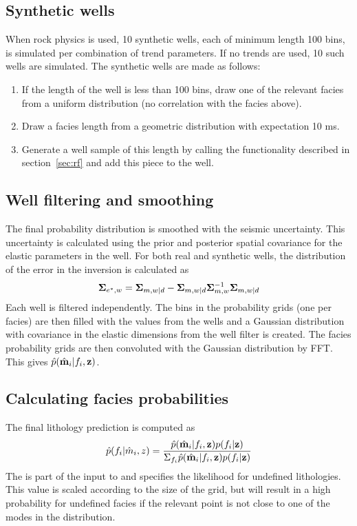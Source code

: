 \subsection{Synthetic wells}
When rock physics is used, 10 synthetic wells, each of minimum length 100 bins, is simulated per combination of trend parameters. If no trends are used, 10 such wells are simulated. The synthetic wells are made as follows:
\begin{enumerate}
\item If the length of the well is less than 100 bins, draw one of the relevant facies from a uniform distribution (no correlation with the facies above).
\item Draw a facies length from a geometric distribution with expectation 10 ms.
\item Generate a well sample of this length by calling the functionality described in section~\ref{sec:rf} and add this piece to the well.
\end{enumerate}

\subsection{Well filtering and smoothing}
The final probability distribution is smoothed with the seismic uncertainty. This uncertainty is calculated using the prior and posterior spatial covariance for the elastic parameters in the well. For both real and synthetic wells, the distribution of the error in the inversion is calculated as
\label{eq:}
\begin{equation}
\mathbf{\Sigma}_{e^*,w} = \mathbf{\Sigma}_{m,w|d} - \mathbf{\Sigma}_{m,w|d} \mathbf{\Sigma}_{m,w}^{-1} \mathbf{\Sigma}_{m,w|d}
\end{equation}
Each well is filtered independently. The bins in the probability grids (one per facies) are then filled with the values from the wells and a Gaussian distribution with covariance in the elastic dimensions from the well filter is created. The facies probability grids are then convoluted with the Gaussian distribution by FFT. This gives $ \hat{p}(\hat{\mathbf{m}}_i|f_i,\mathbf{z}) $.
\subsection{Calculating facies probabilities}
The final lithology prediction is computed as
\begin{equation}
\hat{p}(f_i|\hat{m}_i,z) = \frac{\hat{p}(\hat{\mathbf{m}}_i|f_i,\mathbf{z}) p(f_i|\mathbf{z})}{\Sigma_{f_i} \hat{p}(\hat{\mathbf{m}}_i|f_i,\mathbf{z}) p(f_i|\mathbf{z})}
\end{equation} 
The  is part of the input to \crava and specifies the likelihood for undefined lithologies. This value is scaled according to the size of the grid, but will result in a high probability for undefined facies if the relevant point is not close to one of the modes in the distribution.
